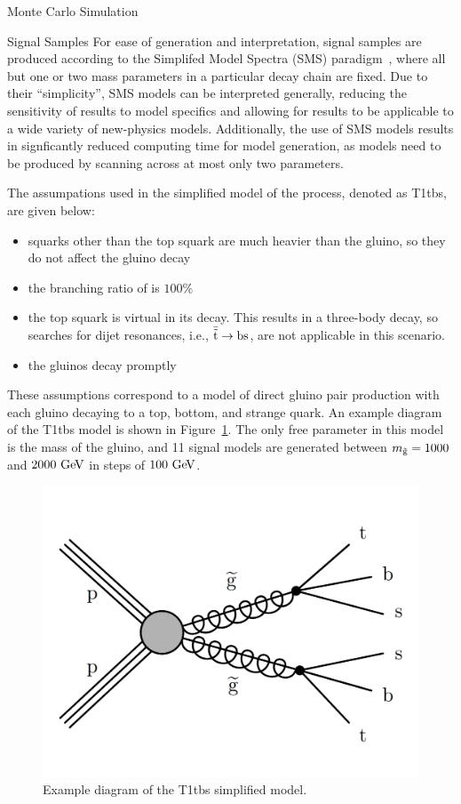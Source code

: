 \begin{section}{Monte Carlo Simulation}
\begin{subsection}{Signal Samples}
For ease of generation and interpretation, signal samples are produced according to the Simplifed Model Spectra (SMS) paradigm~\cite{Alwall:2008ag,Alves:2011wf}, where all but one or two mass parameters in a particular decay chain are fixed.
Due to their ``simplicity'', SMS models can be interpreted generally, reducing the sensitivity of results to model specifics and allowing for results to be applicable to a wide variety of new-physics models.
Additionally, the use of SMS models results in signficantly reduced computing time for model generation, as models need to be produced by scanning across at most only two parameters.

The assumpations used in the simplified model of the \rpvDecay process, denoted as T1tbs, are given below:
\begin{itemize}
\item squarks other than the top squark are much heavier than the gluino, so they do not affect the gluino decay
\item the branching ratio of \rpvDecay is $100\%$
\item the top squark is virtual in its decay. This results in a three-body decay, so searches for dijet resonances, i.e., $\bar{\tilde{\mathrm{t}}} \to \mathrm{bs}$, are not applicable in this scenario.
\item the gluinos decay promptly
\end{itemize}

These assumptions correspond to a model of direct gluino pair production with each gluino decaying to a top, bottom, and strange quark. 
An example diagram of the T1tbs model is shown in Figure~\ref{fig:T1tbs_diagram}.
The only free parameter in this model is the mass of the gluino, and 11 signal models are generated between $m_{\tilde{\mathrm{g}}} = 1000$ and $2000~\mathrm{Ge\kern -0.1em V}$ in steps of $100~\mathrm{Ge\kern -0.1em V}$.

\begin{figure}[tbp!]
\begin{center}
\includegraphics[angle=0,width=0.60\columnwidth]{fig/T1tbs_diagram.png}
\end{center}
\caption{Example diagram of the T1tbs simplified model.}
\label{fig:T1tbs_diagram}
\end{figure}


\end{subsection}
\end{section}
